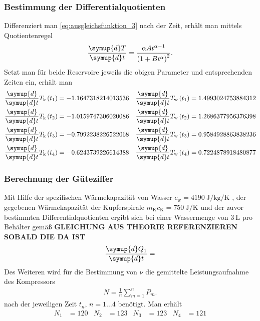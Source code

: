 \subsubsection[]{Bestimmung der Differentialquotienten}
Differenziert man \eqref{eq:ausgleichsfunktion_3} nach der Zeit, erhält man mittels Quotientenregel
\begin{align*}
    \frac{\symup{d}T}{\symup{d}t} = \frac{\alpha A t^{\alpha -1}}{\left(1 + B t^{\alpha}\right)^2}.
\end{align*}
%
Setzt man für beide Reservoire jeweils die obigen Parameter und entsprechenden Zeiten ein, erhält man 
\begin{align*}
    \frac{\symup{d}}{\symup{d}t} T_\text{k} \left(t_1\right) &= -1.1647318214013536 &
    \frac{\symup{d}}{\symup{d}t} T_\text{w} \left(t_1\right) &= 1.4993024753884312  \\
    \frac{\symup{d}}{\symup{d}t} T_\text{k} \left(t_2\right) &= -1.0159747306020086 &
    \frac{\symup{d}}{\symup{d}t} T_\text{w} \left(t_2\right) &= 1.2686377956376398 \\
    \frac{\symup{d}}{\symup{d}t} T_\text{k} \left(t_3\right) &= -0.7992238226522068 &
    \frac{\symup{d}}{\symup{d}t} T_\text{w} \left(t_3\right) &= 0.9584928863838236 \\
    \frac{\symup{d}}{\symup{d}t} T_\text{k} \left(t_4\right) &= -0.6243739226614388 &
    \frac{\symup{d}}{\symup{d}t} T_\text{w} \left(t_4\right) &= 0.7224878918480877 
\end{align*}
%

\subsubsection[]{Berechnung der Güteziffer}
Mit Hilfe der spezifischen Wärmekapazität von Wasser $c_{\text{w}} = \qty{4190}{\joule\per\kg\per\kelvin}$ \cite[]{leifi}, der gegebenen Wärmekapazität
der Kupferspirale $m_{\text{K}} c_{\text{K}} = \qty{750}{\joule\per\kelvin}$ und der zuvor bestimmten Differentialquotienten
ergibt sich bei einer Wassermenge von $\qty[]{3}{\liter}$ pro Behälter gemäß \textbf{GLEICHUNG AUS THEORIE REFERENZIEREN SOBALD DIE DA IST}
\begin{align*}
    \frac{\symup{d}Q_1}{\symup{d}t} =
\end{align*}
%
Des Weiteren wird für die Bestimmung von $\nu$ die gemittelte Leistungsaufnahme des Kompressors
\begin{align*}
    N = \frac{1}{n} \sum_{m=1}^{n} P_m.
\end{align*}
nach der jeweiligen Zeit $t_n, \, n = 1 \dotsc 4$ benötigt.
Man erhält
\begin{align*}
    N_1  &=  120 &
    N_2  &=  123 &
    N_3  &=  123 &
    N_4  &=  121
\end{align*}